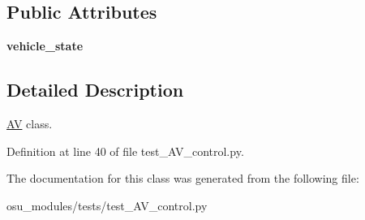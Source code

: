\subsection*{Public Attributes}
\begin{DoxyCompactItemize}
\item 
\mbox{\label{classtest__AV__control_1_1AV_a920ffe826ec8ab67d319ec238561a79a}} 
{\bfseries vehicle\+\_\+state}
\end{DoxyCompactItemize}


\subsection{Detailed Description}
\hyperlink{classtest__AV__control_1_1AV}{AV} class. 

Definition at line 40 of file test\+\_\+\+A\+V\+\_\+control.\+py.



The documentation for this class was generated from the following file\+:\begin{DoxyCompactItemize}
\item 
osu\+\_\+modules/tests/test\+\_\+\+A\+V\+\_\+control.\+py\end{DoxyCompactItemize}
